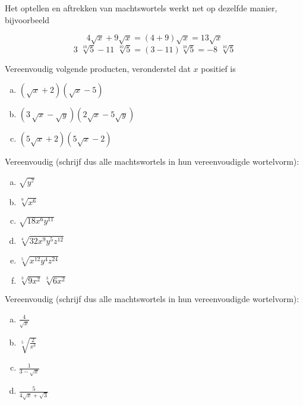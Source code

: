 \documentclass[12pt,twoside]{article}
\begin{document}
Het optellen en aftrekken van machtswortels werkt net op dezelfde manier, bijvoorbeeld

\[4\sqrt x + 9\sqrt x = \left( {4 + 9} \right)\sqrt x = 13\sqrt x\]
\[3\,\,\sqrt[{10}]{5} - 11\,\,\sqrt[{10}]{5} = \left( {3 - 11} \right)\sqrt[{10}]{5} = - 8\,\,\sqrt[{10}]{5}\]

\begin{oefening}
  Vereenvoudig volgende producten, veronderstel dat $x$ positief is
  \begin{enumerate}[(a)]
    \itemsep1em
  \item \(\left( {\sqrt x + 2} \right)\left( {\sqrt x - 5} \right)\)
  \item \(\left( {3\,\sqrt x - \sqrt y } \right)\left( {2\sqrt x - 5\sqrt y } \right)\)
  \item \(\left( {5\sqrt x + 2} \right)\left( {5\sqrt x - 2} \right)\)
  \end{enumerate}
\end{oefening}

\begin{oefening}
  Vereenvoudig (schrijf dus alle machtswortels in hun vereenvoudigde wortelvorm):
  \begin{multicols}{3}
    \begin{enumerate}[(a)]
      \itemsep1em
    \item \(\sqrt {{y^7}} \)
    \item \(\sqrt[9]{{{x^6}}}\)
    \item \(\sqrt {18{x^6}{y^{11}}} \)
    \item \(\sqrt[4]{{32{x^9}{y^5}{z^{12}}}}\)
    \item \(\sqrt[5]{{{x^{12}}{y^4}{z^{24}}}}\)
    \item \(\sqrt[3]{{9{x^2}}}\,\sqrt[3]{{6{x^2}}}\)
    \end{enumerate}
  \end{multicols}
\end{oefening}

\begin{oefening}
  Vereenvoudig (schrijf dus alle machtswortels in hun vereenvoudigde wortelvorm):
  \begin{multicols}{2}
    \begin{enumerate}[(a)]
      \itemsep1em
    \item \( \displaystyle \frac{4}{{\sqrt x }}\)
    \item \( \displaystyle \sqrt[5]{{\frac{2}{{{x^3}}}}}\)
    \item \( \displaystyle \frac{1}{{3 - \sqrt x }}\)
    \item \( \displaystyle \frac{5}{{4\sqrt x + \sqrt 3 }}\)
    \end{enumerate}
  \end{multicols}
\end{oefening}
\end{document}
